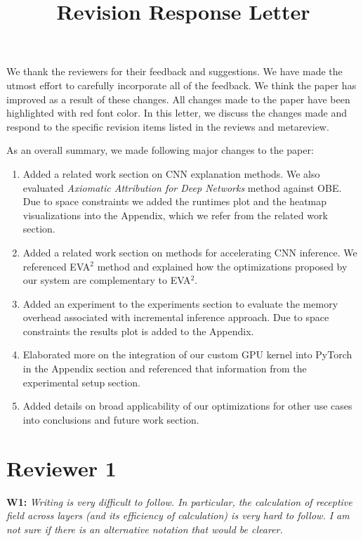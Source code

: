 \documentclass[preprint]{vldb}
\title{Revision Response Letter}
\author{}
\begin{document}
\maketitle

We thank the reviewers for their feedback and suggestions. We have made the utmost effort to carefully incorporate all of the feedback. 
We think the paper has improved as a result of these changes.
All changes made to the paper have been highlighted with red font color.
In this letter, we discuss the changes made and respond to the specific revision items listed in the reviews and metareview. 

As an overall summary, we made following major changes to the paper:
\begin{enumerate}
	\item Added a related work section on CNN explanation methods. We also evaluated \textit{Axiomatic Attribution for Deep Networks} method against OBE. Due to space constraints we added the runtimes plot and the heatmap visualizations into the Appendix, which we refer from the related work section.
	\item Added a related work section on methods for accelerating CNN inference. We referenced EVA$^2$ method and explained how the optimizations proposed by our system are complementary to EVA$^2$.
	\item Added an experiment to the experiments section to evaluate the memory overhead associated with incremental inference approach. Due to space constraints the results plot is added to the Appendix.
	\item Elaborated more on the integration of our custom GPU kernel into PyTorch in the Appendix section and referenced that information from the experimental setup section.
	\item Added details on broad applicability of our optimizations for other use cases into conclusions and future work section.
\end{enumerate}

\section{Reviewer 1}

\vspace{2mm}
\noindent \textbf{W1:} \textit{Writing is very difficult to follow. In particular, the calculation of receptive field across layers (and its efficiency of calculation) is very hard to follow. I am not sure if there is an alternative notation that would be clearer.}
\end{document}
